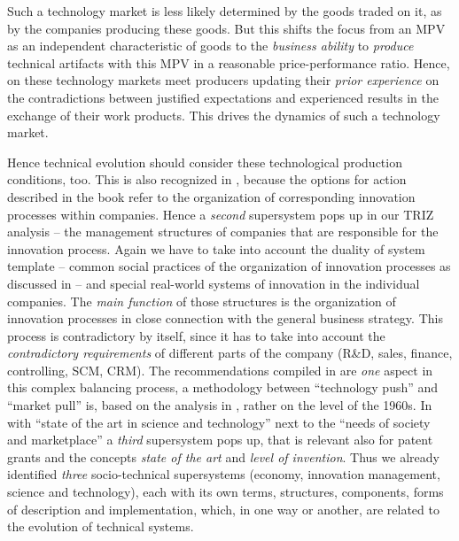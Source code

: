 \documentclass{llncs}
\begin{document}
Such a technology market is less likely determined by the goods traded on it,
as by the companies producing these goods.  But this shifts the focus from an
MPV as an independent characteristic of goods to the \emph{business ability}
to \emph{produce} technical artifacts with this MPV in a reasonable
price-performance ratio.  Hence, on these technology markets meet producers
updating their \emph{prior experience} on the contradictions between justified
expectations and experienced results in the exchange of their work products.
This drives the dynamics of such a technology market.

Hence technical evolution should consider these technological production
conditions, too. This is also recognized in \cite{TESE2018}, because the
options for action described in the book refer to the organization of
corresponding innovation processes within companies. Hence a \emph{second}
supersystem pops up in our TRIZ analysis -- the management structures of
companies that are responsible for the innovation process. Again we have to
take into account the duality of system template -- common social practices of
the organization of innovation processes as discussed in \cite{Preez2006} --
and special real-world systems of innovation in the individual companies. The
\emph{main function} of those structures is the organization of innovation
processes in close connection with the general business strategy. This process
is contradictory by itself, since it has to take into account the
\emph{contradictory requirements} of different parts of the company (R\&D,
sales, finance, controlling, SCM, CRM). The recommendations compiled in
\cite{TESE2018} are \emph{one} aspect in this complex balancing process, a
methodology between ``technology push'' and ``market pull'' is, based on the
analysis in \cite{Preez2006}, rather on the level of the 1960s. In
\cite[Fig.~3]{Preez2006} with ``state of the art in science and technology''
next to the ``needs of society and marketplace'' a \emph{third} supersystem
pops up, that is relevant also for patent grants and the concepts \emph{state
  of the art} and \emph{level of invention}.  Thus we already identified
\emph{three} socio-technical supersystems (economy, innovation management,
science and technology), each with its own terms, structures, components,
forms of description and implementation, which, in one way or another, are
related to the evolution of technical systems.
\end{document}
